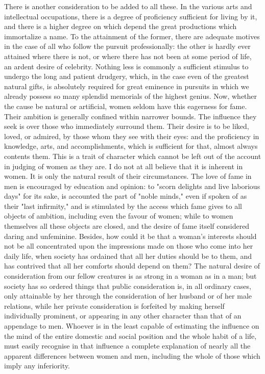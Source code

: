 \documentclass[12pt]{report}
\begin{document}
There is another consideration to be added to all these. In the various arts and intellectual occupations, there is a degree of proficiency sufficient for living by it, and there is a higher degree on which depend the great productions which immortalize a name. To the attainment of the former, there are adequate motives in the case of all who follow the pursuit professionally: the other is hardly ever attained where there is not, or where there has not been at some period of life, an ardent desire of celebrity. Nothing less is commonly a sufficient stimulus to undergo the long and patient drudgery, which, in the case even of the greatest natural gifts, is absolutely required for great eminence in pursuits in which we already possess so many splendid memorials of the highest genius. Now, whether the cause be natural or artificial, women seldom have this eagerness for fame. Their ambition is generally confined within narrower bounds. The influence they seek is over those who immediately surround them. Their desire is to be liked, loved, or admired, by those whom they see with their eyes: and the proficiency in knowledge, arts, and accomplishments, which is sufficient for that, almost always contents them. This is a trait of character which cannot be left out of the account in judging of women as they are. I do not at all believe that it is inherent in women. It is only the natural result of their circumstances. The love of fame in men is encouraged by education and opinion: to "scorn delights and live laborious days" for its sake, is accounted the part of "noble minds," even if spoken of as their "last infirmity," and is stimulated by the access which fame gives to all objects of ambition, including even the favour of women; while to women themselves all these objects are closed, and the desire of fame itself considered daring and unfeminine. Besides, how could it be that a woman's interests should not be all concentrated upon the impressions made on those who come into her daily life, when society has ordained that all her duties should be to them, and has contrived that all her comforts should depend on them? The natural desire of consideration from our fellow creatures is as strong in a woman as in a man; but society has so ordered things that public consideration is, in all ordinary cases, only attainable by her through the consideration of her husband or of her male relations, while her private consideration is forfeited by making herself individually prominent, or appearing in any other character than that of an appendage to men. Whoever is in the least capable of estimating the influence on the mind of the entire domestic and social position and the whole habit of a life, must easily recognise in that influence a complete explanation of nearly all the apparent differences between women and men, including the whole of those which imply any inferiority.
\end{document}
